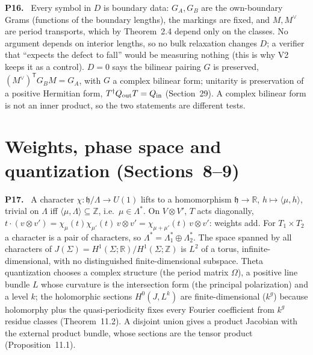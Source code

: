 \documentclass[11pt]{article}
\newcommand{\Z}{\mathbb{Z}}
\newcommand{\R}{\mathbb{R}}
\newenvironment{solution}[1]{\medskip\noindent\textbf{P#1.}\ }{\par\medskip}
\begin{document}
\begin{solution}{16}
Every symbol in $D$ is boundary data: $G_A,G_B$ are the own-boundary Grams
(functions of the boundary lengths), the markings are fixed, and $M,M^\vee$
are period transports, which by Theorem~2.4 depend only on the classes. No
argument depends on interior lengths, so no bulk relaxation changes $D$; a
verifier that ``expects the defect to fall'' would be measuring nothing
(this is why V2 keeps it as a control). $D = 0$ says the bilinear pairing
$G$ is preserved, $(M^\vee)^{\mathsf T}G_BM = G_A$, with $G$ a complex bilinear
form; unitarity is preservation of a positive Hermitian form,
$T^\dagger Q_{\rm out}T = Q_{\rm in}$ (Section~29). A complex bilinear form is
not an inner product, so the two statements are different tests.
\end{solution}

\section*{Weights, phase space and quantization (Sections~8--9)}

\begin{solution}{17}
A character $\chi:\mathfrak h/\Lambda\to U(1)$ lifts to a homomorphism
$\mathfrak h\to\R$, $h\mapsto\langle\mu,h\rangle$, trivial on $\Lambda$ iff
$\langle\mu,\Lambda\rangle\subseteq\Z$, i.e.\ $\mu\in\Lambda^*$. On $V\otimes V'$,
$T$ acts diagonally, $t\cdot(v\otimes v') = \chi_\mu(t)\chi_{\mu'}(t)\,v\otimes v'
= \chi_{\mu+\mu'}(t)\,v\otimes v'$: weights add. For $T_1\times T_2$ a character
is a pair of characters, so $\Lambda^* = \Lambda_1^*\oplus\Lambda_2^*$. The
space spanned by all characters of $J(\Sigma) = H^1(\Sigma;\R)/H^1(\Sigma;\Z)$
is $L^2$ of a torus, infinite-dimensional, with no distinguished
finite-dimensional subspace. Theta quantization chooses a complex structure
(the period matrix $\Omega$), a positive line bundle $L$ whose curvature is the
intersection form (the principal polarization) and a level $k$; the
holomorphic sections $H^0(J,L^k)$ are finite-dimensional ($k^g$) because
holomorphy plus the quasi-periodicity fixes every Fourier coefficient from
$k^g$ residue classes (Theorem~11.2). A disjoint union gives a product
Jacobian with the external product bundle, whose sections are the tensor
product (Proposition~11.1).
\end{solution}
\end{document}

